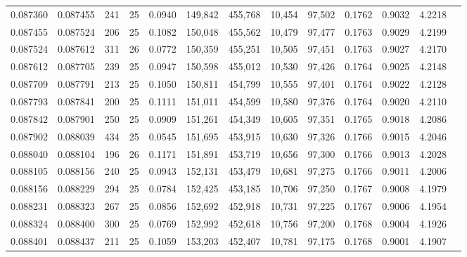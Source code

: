 \begin{tabular}{rrrrrrrrrrrrr}
0.087360 & 0.087455 & 241 &  25 &                                     0.0940 & 149,842 & 455,768 &  10,454 &  97,502 & 0.1762 & 0.9032 & 4.2218 \\
0.087455 & 0.087524 & 206 &  25 &                                     0.1082 & 150,048 & 455,562 &  10,479 &  97,477 & 0.1763 & 0.9029 & 4.2199 \\
0.087524 & 0.087612 & 311 &  26 &                                     0.0772 & 150,359 & 455,251 &  10,505 &  97,451 & 0.1763 & 0.9027 & 4.2170 \\
0.087612 & 0.087705 & 239 &  25 &                                     0.0947 & 150,598 & 455,012 &  10,530 &  97,426 & 0.1764 & 0.9025 & 4.2148 \\
0.087709 & 0.087791 & 213 &  25 &                                     0.1050 & 150,811 & 454,799 &  10,555 &  97,401 & 0.1764 & 0.9022 & 4.2128 \\
0.087793 & 0.087841 & 200 &  25 &                                     0.1111 & 151,011 & 454,599 &  10,580 &  97,376 & 0.1764 & 0.9020 & 4.2110 \\
0.087842 & 0.087901 & 250 &  25 &                                     0.0909 & 151,261 & 454,349 &  10,605 &  97,351 & 0.1765 & 0.9018 & 4.2086 \\
0.087902 & 0.088039 & 434 &  25 &                                     0.0545 & 151,695 & 453,915 &  10,630 &  97,326 & 0.1766 & 0.9015 & 4.2046 \\
0.088040 & 0.088104 & 196 &  26 &                                     0.1171 & 151,891 & 453,719 &  10,656 &  97,300 & 0.1766 & 0.9013 & 4.2028 \\
0.088105 & 0.088156 & 240 &  25 &                                     0.0943 & 152,131 & 453,479 &  10,681 &  97,275 & 0.1766 & 0.9011 & 4.2006 \\
0.088156 & 0.088229 & 294 &  25 &                                     0.0784 & 152,425 & 453,185 &  10,706 &  97,250 & 0.1767 & 0.9008 & 4.1979 \\
0.088231 & 0.088323 & 267 &  25 &                                     0.0856 & 152,692 & 452,918 &  10,731 &  97,225 & 0.1767 & 0.9006 & 4.1954 \\
0.088324 & 0.088400 & 300 &  25 &                                     0.0769 & 152,992 & 452,618 &  10,756 &  97,200 & 0.1768 & 0.9004 & 4.1926 \\
0.088401 & 0.088437 & 211 &  25 &                                     0.1059 & 153,203 & 452,407 &  10,781 &  97,175 & 0.1768 & 0.9001 & 4.1907 \\

\end{tabular}
